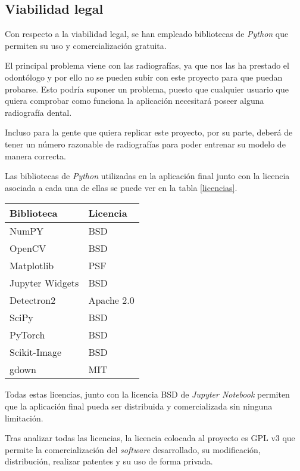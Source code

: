 \subsection{Viabilidad legal}
Con respecto a la viabilidad legal, se han empleado bibliotecas de \emph{Python} que permiten su uso y comercialización gratuita. 

El principal problema viene con las radiografías, ya que nos las ha prestado el odontólogo y por ello no se pueden subir con este proyecto para que puedan probarse. Esto podría suponer un problema, puesto que cualquier usuario que quiera comprobar como funciona la aplicación necesitará poseer alguna radiografía dental.

Incluso para la gente que quiera replicar este proyecto, por su parte, deberá de tener un número razonable de radiografías para poder entrenar su modelo de manera correcta.

Las bibliotecas de \emph{Python} utilizadas en la aplicación final junto con la licencia asociada a cada una de ellas se puede ver en la tabla \ref{licencias}.
\begin{center}
\begin{tabular}{|l|l|}
\hline
\textbf{Biblioteca} & \textbf{Licencia} \\ \hline
NumPY               & BSD               \\ \hline
OpenCV              & BSD               \\ \hline
Matplotlib          & PSF               \\ \hline
Jupyter Widgets     & BSD               \\ \hline
Detectron2          & Apache 2.0        \\ \hline
SciPy               & BSD               \\ \hline
PyTorch             & BSD               \\ \hline
Scikit-Image        & BSD               \\ \hline
gdown               & MIT               \\ \hline
\end{tabular}
\label{licencias}
\end{center}

Todas estas licencias, junto con la licencia BSD de \emph{Jupyter Notebook} permiten que la aplicación final pueda ser distribuida y comercializada sin ninguna limitación.

Tras analizar todas las licencias, la licencia colocada al proyecto es GPL v3 que permite la comercialización del \emph{software} desarrollado, su modificación, distribución, realizar patentes y su uso de forma privada.